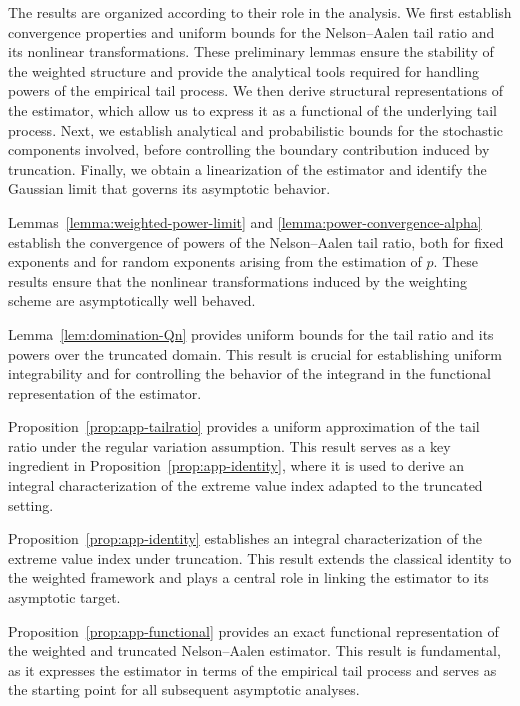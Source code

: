 \documentclass[reqno,openbib,runningheads,a4paper,12pt]{amsart}%
\begin{document}
\noindent The results are organized according to their role in the analysis.
We first establish convergence properties and uniform bounds for the
Nelson--Aalen tail ratio and its nonlinear transformations. These preliminary
lemmas ensure the stability of the weighted structure and provide the
analytical tools required for handling powers of the empirical tail process.
We then derive structural representations of the estimator, which allow us to
express it as a functional of the underlying tail process. Next, we establish
analytical and probabilistic bounds for the stochastic components involved,
before controlling the boundary contribution induced by truncation. Finally,
we obtain a linearization of the estimator and identify the Gaussian limit
that governs its asymptotic behavior.\smallskip

\noindent Lemmas~\ref{lemma:weighted-power-limit} and
\ref{lemma:power-convergence-alpha} establish the convergence of powers of the
Nelson--Aalen tail ratio, both for fixed exponents and for random exponents
arising from the estimation of $p$. These results ensure that the nonlinear
transformations induced by the weighting scheme are asymptotically well
behaved.\smallskip

\noindent Lemma~\ref{lem:domination-Qn} provides uniform bounds for the tail
ratio and its powers over the truncated domain. This result is crucial for
establishing uniform integrability and for controlling the behavior of the
integrand in the functional representation of the estimator.\smallskip

\noindent Proposition~\ref{prop:app-tailratio} provides a uniform
approximation of the tail ratio under the regular variation assumption. This
result serves as a key ingredient in Proposition~\ref{prop:app-identity},
where it is used to derive an integral characterization of the extreme value
index adapted to the truncated setting.\smallskip

\noindent Proposition~\ref{prop:app-identity} establishes an integral
characterization of the extreme value index under truncation. This result
extends the classical identity to the weighted framework and plays a central
role in linking the estimator to its asymptotic target.\smallskip

\noindent Proposition~\ref{prop:app-functional} provides an exact functional
representation of the weighted and truncated Nelson--Aalen estimator. This
result is fundamental, as it expresses the estimator in terms of the empirical
tail process and serves as the starting point for all subsequent asymptotic
analyses.\smallskip
\end{document}
